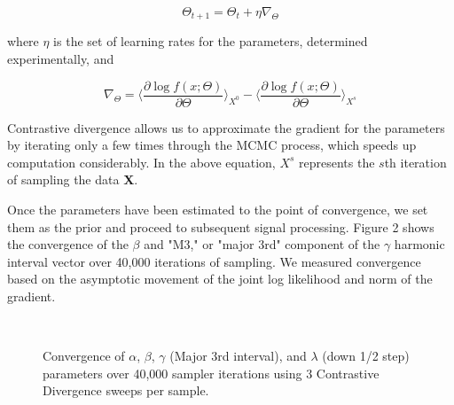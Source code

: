 \documentclass{article}
\begin{document}
\[\Theta_{t+1} = \Theta_t + \eta\nabla_{\Theta}\]

where $\eta$ is the set of learning rates for the parameters, determined experimentally, and

\[\nabla_{\Theta} = \langle\frac{\partial\log{f(x;\Theta)}}{\partial\Theta}\rangle_{X^0} - \langle\frac{\partial\log{f(x;\Theta)}}{\partial\Theta}\rangle_{X^s}\]

Contrastive divergence allows us to approximate the gradient for the parameters by iterating only a few times through the MCMC process, which speeds up computation considerably.  In the above equation, $X^s$ represents the $s$th iteration of sampling the data {\bf X}.

Once the parameters have been estimated to the point of convergence, we set them as the prior and proceed to subsequent signal processing.  Figure 2 shows the convergence of the $\beta$ and "M3," or "major 3rd" component of the $\gamma$ harmonic interval vector over 40,000 iterations of sampling.  We measured convergence based on the asymptotic movement of the joint log likelihood and norm of the gradient.

\begin{figure}
\centering
\mbox{
\quad
{}\quad
{}\quad
{}
}
\centering
\caption{Convergence of $\alpha$, $\beta$, $\gamma$ (Major 3rd interval), and $\lambda$ (down 1/2 step) parameters over 40,000 sampler iterations using 3 Contrastive Divergence sweeps per sample.}
\label{fig-all}
\end{figure}
\end{document}
